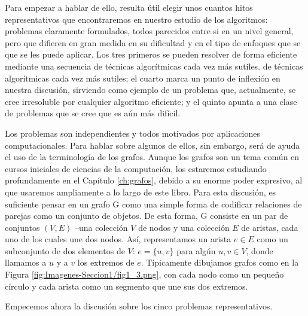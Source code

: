 \documentclass[a4paper, 12pt]{book}
\theoremstyle{dotless}
\begin{document}
Para empezar a hablar de ello, resulta útil elegir unos cuantos hitos representativos que encontraremos en nuestro estudio de los algoritmos: problemas claramente formulados, todos parecidos entre si en un nivel general, pero que difieren en gran medida en su dificultad y en el tipo de enfoques que se que se les puede aplicar. Los tres primeros se pueden resolver de forma eficiente mediante una secuencia de técnicas algorítmicas cada vez más sutiles. de técnicas algorítmicas cada vez más sutiles; el cuarto marca un punto de inflexión en nuestra discusión, sirviendo como ejemplo de un problema que, actualmente, se cree irresoluble por cualquier algoritmo eficiente; y el quinto apunta a una clase de problemas que se cree que es aún más difícil.

Los problemas son independientes y todos motivados por aplicaciones computacionales. Para hablar sobre algunos de ellos, sin embargo, será de ayuda el uso de la terminología de los grafos. Aunque los grafos son un tema común en cursos iniciales de ciencias de la computación, los estaremos estudiando profundamente en el Capítulo \ref{ch:grafos}, debido a su enorme poder expresivo, al que usaremos ampliamente a lo largo de este libro. Para esta discusión, es suficiente pensar en un grafo G como una simple forma de codificar relaciones de parejas como un conjunto de objetos. De esta forma, G consiste en un par de conjuntos $(V,E)$ --una colección $V$ de nodos y una colección $E$ de aristas, cada uno de los cuales une dos nodos. Así, representamos un arista $e \in  E$ como un subconjunto de dos elementos de $V$: $e = \{u,v\}$ para algún $u,v \in V$, donde llamamos a $u$ y a $v$ los extremos de $e$. Típicamente dibujamos grafos como en la Figura \ref{fig:Imagenes-Seccion1/fig1_3.png}, con cada nodo como un pequeño círculo y cada arista como un segmento que une sus dos extremos.

Empecemos ahora la discusión sobre los cinco problemas representativos.
\end{document}
